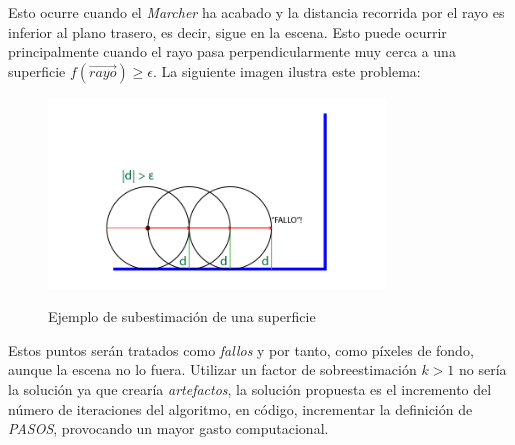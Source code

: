 Esto ocurre cuando el \textit{Marcher} ha acabado y la distancia recorrida por el rayo es inferior al plano trasero, es decir, sigue en la escena. Esto puede ocurrir principalmente cuando el rayo pasa perpendicularmente muy cerca a una superficie \(f(\Vec{rayo}) \ge \epsilon\). La siguiente imagen ilustra este problema:

\begin{figure}[H]
  \centering
  \captionsetup{justification=centering}%
  \includegraphics[width=0.8\textwidth]{secciones/imagenes/estimation/subestimacion.png}\label{fig:subestimacion}
  \caption{Ejemplo de subestimación de una superficie}
\end{figure}

Estos puntos serán tratados como \textit{fallos} y por tanto, como píxeles de fondo, aunque la escena no lo fuera. Utilizar un factor de sobreestimación \(k > 1\) no sería la solución ya que crearía \textit{artefactos}, la solución propuesta es el incremento del número de iteraciones del algoritmo, en código, incrementar la definición de \textit{PASOS}, provocando un mayor gasto computacional.